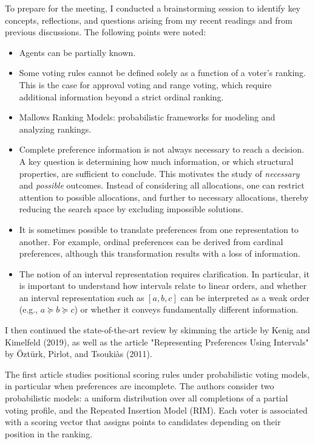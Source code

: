 \documentclass{article}
\begin{document}
To prepare for the meeting, I conducted a brainstorming session to identify key concepts, reflections, and questions arising from my recent readings and from previous discussions. The following points were noted:
\begin{itemize}
    \item Agents can be partially known.
    \item Some voting rules cannot be defined solely as a function of a voter's ranking. This is the case for approval voting and range voting, which require additional information beyond a strict ordinal ranking.
    \item Mallows Ranking Models: probabilistic frameworks for modeling and analyzing rankings.
    \item Complete preference information is not always necessary to reach a decision. A key question is determining how much information, or which structural properties, are sufficient to conclude. This motivates the study of \textit{necessary} and \textit{possible} outcomes. Instead of considering all allocations, one can restrict attention to possible allocations, and further to necessary allocations, thereby reducing the search space by excluding impossible solutions.
    \item It is sometimes possible to translate preferences from one representation to another. For example, ordinal preferences can be derived from cardinal preferences, although this transformation results with a loss of information.
    \item The notion of an interval representation requires clarification. In particular, it is important to understand how intervals relate to linear orders, and whether an interval representation such as $[a,b,c]$ can be interpreted as a weak order (e.g., $a \succeq b \succeq c$) or whether it conveys fundamentally different information.
\end{itemize}

I then continued the state-of-the-art review by skimming the article by Kenig and Kimelfeld (2019), as well as the article "Representing Preferences Using Intervals" by Öztürk, Pirlot, and Tsoukiàs (2011).

The first article studies positional scoring rules under probabilistic voting models, in particular when preferences are incomplete. The authors consider two probabilistic models: a uniform distribution over all completions of a partial voting profile, and the Repeated Insertion Model (RIM). Each voter is associated with a scoring vector that assigns points to candidates depending on their position in the ranking.
\end{document}
